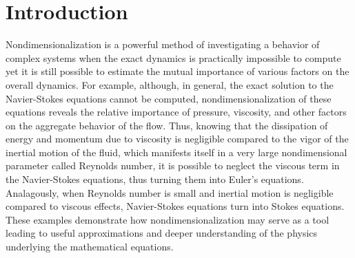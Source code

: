 \documentclass[oneside]{amsbook}
\theoremstyle{definition}
\theoremstyle{remark}
\numberwithin{section}{chapter}
\numberwithin{equation}{chapter}
\begin{document}

\setcounter{page}{4}
\setcounter{tocdepth}{2}

\tableofcontents

% 

\mainmatter

\chapter*{Introduction}

Nondimensionalization is a powerful method of investigating a behavior of complex systems when the exact dynamics is practically impossible to compute yet it is still possible to estimate the mutual importance of various factors on the overall dynamics. For example, although, in general, the exact solution to the Navier-Stokes equations cannot be computed, nondimensionalization of these equations reveals the relative importance of pressure, viscosity, and other factors on the aggregate behavior of the flow. Thus, knowing that the dissipation of energy and momentum due to viscosity is negligible compared to the vigor of the inertial motion of the fluid, which manifests itself in a very large nondimensional parameter called Reynolds number, it is possible to neglect the viscous term in the Navier-Stokes equations, thus turning them into Euler's equations. Analagously, when Reynolds number is small and inertial motion is negligible compared to viscous effects, Navier-Stokes equations turn into Stokes equations. These examples demonstrate how nondimensionalization may serve as a tool leading to useful approximations and deeper understanding of the physics underlying the mathematical equations.
\end{document}
